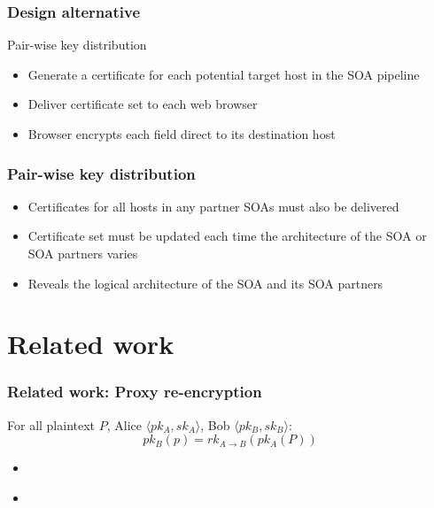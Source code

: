 \documentclass{beamer}
\begin{document}

\begin{frame}
\frametitle{Design alternative}
Pair-wise key distribution
\smallskip
\begin{itemize}
\item Generate a certificate for each potential target host in the SOA pipeline
\item Deliver certificate set to each web browser
\item Browser encrypts each field direct to its destination host 
\end{itemize}
\end{frame}

\begin{frame}
\frametitle{Pair-wise key distribution}
\begin{itemize}
\item Certificates for all hosts in any partner SOAs must also be delivered
\item Certificate set must be updated each time the architecture of the SOA or
SOA partners varies
\item Reveals the logical architecture of the SOA and its SOA partners
\end{itemize}
\end{frame}

\section{Related work}

\begin{frame}
\frametitle{Related work: Proxy re-encryption}
For all plaintext $P$, Alice $\langle pk_A, sk_A \rangle$, Bob $\langle pk_B,
sk_B \rangle$:
\begin{equation*}
pk_B(p) = rk_{A \to B}( pk_A (P))
\end{equation*}
\begin{itemize}
\item \cite{atomic_proxy_reencryption} 
\item \cite{proxy_reencryption}
\end{itemize}
\end{frame}
\end{document}
